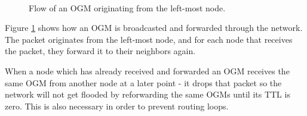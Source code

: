 \begin{figure}[h]
	\centering
	\\
	\caption{Flow of an \acf{OGM} originating from the left-most node.}
	\label{fig:ogm_packet_flow}
\end{figure}

Figure \ref{fig:ogm_packet_flow} shows how an
\ac{OGM} is broadcasted and forwarded through the network. The packet originates from the left-most node,
and for each node that receives the packet, they forward it to their neighbors
again.

When a node which has already received and forwarded an \ac{OGM} receives the
same \ac{OGM} from another node at a later point - it drops that packet so the
network will not get flooded by reforwarding the same \acp{OGM} until its
\ac{TTL} is zero. This is also necessary in order to prevent routing loops.

